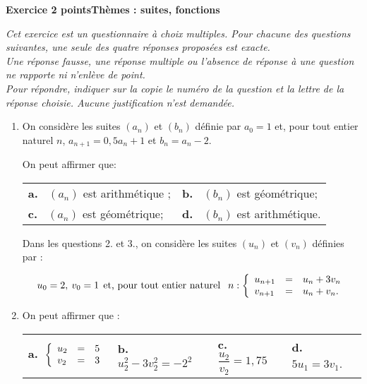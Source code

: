 \documentclass[10pt,a4paper]{article}
\begin{document}
\bigskip

\textbf{Exercice 2  points\hfill Thèmes : suites, fonctions}

\medskip

\emph{Cet exercice est un questionnaire à choix multiples. Pour chacune des questions suivantes, une seule des quatre réponses proposées est exacte.\\
Une réponse fausse, une réponse multiple ou l'absence de réponse à une question ne rapporte ni n'enlève de point.\\
Pour répondre, indiquer sur la copie le numéro de la question et la lettre de la réponse choisie. Aucune justification n'est demandée.}

\medskip

\begin{enumerate}
\item On considère les suites $\left(a_n\right)$ et $\left(b_n\right)$ définie par $a_0 = 1$ et, pour tout entier naturel $n$,\: $a_{n+1} = 0,5a_n + 1$ et $b_n = a_n - 2$.

On peut affirmer que:

\begin{center}
\begin{tabularx}{\linewidth}{*{2}{X}}
\textbf{a.~} $\left(a_n\right)$ est arithmétique ;&\textbf{b.~} $\left(b_n\right)$ est géométrique;\\
\textbf{c.~} $\left(a_n\right)$ est géométrique;&\textbf{d.~} $\left(b_n\right)$ est arithmétique. 
\end{tabularx}
\end{center}

Dans les questions 2. et 3., on considère les suites $\left(u_n\right)$ et $\left(v_n\right)$ définies par :

\[u_0 = 2,\: v_0 = 1 \:\: \text{et, pour tout entier naturel }\:\:n : \left\{\begin{array}{l c l}
u_{n+1}&=&u_n + 3v_n\\
v_{n+1}&=&u_n + v_n.
\end{array}\right.\]

\item On peut affirmer que :

\begin{center}
\begin{tabularx}{\linewidth}{*{4}{X}}
\textbf{a.~}$\left\{\begin{array}{l c l}
u_2& =& 5\\ v_2 &=& 3
\end{array}\right.$&\textbf{b.~} $u_2^2 - 3v_2^2 = - 2^2$&\textbf{c.~} $\dfrac{u_2}{v_2} = 1,75$&\textbf{d.~} $5u_1 = 3v_1$.\\
\end{tabularx}
\end{center}


\end{enumerate}
\end{document}
